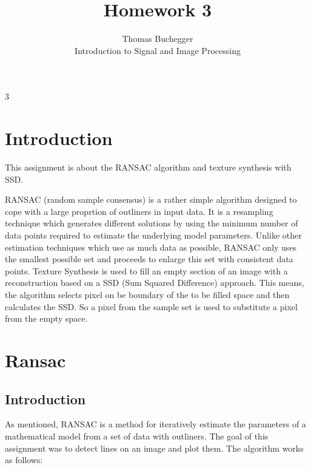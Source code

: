 \documentclass[12pt]{article}
\begin{document}


\title{Homework 3}%
\author{Thomas Buchegger\\ %
Introduction to Signal and Image Processing}
\maketitle

\setcounter{tocdepth}3 %
\tableofcontents

\pagebreak
\section{Introduction}
This assignment is about the RANSAC algorithm and texture synthesis with SSD.
\newline

RANSAC (random sample consensus) is a rather simple algorithm designed to cope with a large proprtion of outliners in input data.
It is a resampling technique which generates different solutions by using the minimum number of data points required to estimate 
the underlying model parameters. Unlike other estimation techniques which use as much data as possible, RANSAC only uses the smallest 
possible set and proceeds to enlarge this set with consistent data points.
\newline
\newline
Texture Synthesis is used to fill an empty section of an image with a reconstruction based on a SSD (Sum Squared Difference) approach. 
This means, the algorithm selects pixel on be boundary of the to be filled space and then calculates the SSD. So a pixel from the sample set 
is used to substitute a pixel from the empty space.

\pagebreak

\section{Ransac}
\subsection{Introduction}
 As mentioned, RANSAC is a method for iteratively estimate the parameters of a mathematical model from a set of data with outliners.
 The goal of this assignment was to detect lines on an image and plot them. The algorithm works as follows:
\end{document}
